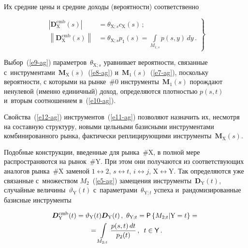 \begin{multicols}{2}
  Их средние цены и средние доходы (ве\-ро\-ят\-ности) соответственно 
  
  \vspace*{2pt}
  
  \noindent
  \begin{equation}
  \left.
  \begin{array}{rl}
  \left\vert \boldsymbol{D}^{\mathrm{cmb}}_{\mathrm{X}}(s)\right\vert &=
\theta_{\mathrm{X};s} c_{\mathrm{X}}(s)\,;\\[6pt]
  \left\| \boldsymbol{D}^{\mathrm{cmb}}_{\mathrm{X}}(s)\right\| 
&=\displaystyle \theta_{\mathrm{X};s} p_1(s)=\int\limits_{M_{1;s}} p(s,y)\,dy\,.
\end{array}
\right\}
  \label{e12-ag}
  \end{equation}
  
  Выбор~(\ref{e9-ag}) параметров~$\theta_{\mathrm{X};s}$ уравнивает 
вероятности, связанные 
с~инструментами~$\boldsymbol{M}_{\mathrm{X}}(s)$~(\ref{e8-ag}) 
и~$\boldsymbol{M}_1(s)$~(\ref{e7-ag}), поскольку вероятности, с которыми на 
рынке~\#0 инструменты~$\boldsymbol{M}_1(s)$ порождают ненулевой (именно 
единичный) доход, определяются плотностью $p(s, t)$ и~вторым соотношением 
в~(\ref{e10-ag}). 
  
  Свойства~(\ref{e12-ag}) инструментов~(\ref{e11-ag}) позволяют назначить 
их, несмотря на составную структуру, новыми цельными базисными 
инструментами комбинированного рынка, фактически реплицирующими 
инструменты~$\boldsymbol{M}_{\mathrm{X}}(s)$. 
  
  Подобные конструкции, введенные для рынка~\#X, в полной мере 
распространяются на рынок~\#Y. При этом они получаются из 
со\-от\-вет\-ст\-ву\-ющих аналогов рынка~\#X заменой $1\leftrightarrow2$, 
$s\leftrightarrow t$, $i\leftrightarrow j$, $\mathrm{X}\leftrightarrow\mathrm{Y}$. 
Так определяются уже связанные с~множеством $M_2$~(\ref{e5-ag}) замещения 
инструменты~$\boldsymbol{D}_{\mathrm{Y}}(t)$, случайные 
величины~$\vartheta_{\mathrm{Y}}(t)$ с~па\-ра\-мет\-ра\-ми~$\theta_{\mathrm{Y};t}$ 
успеха и~рандомизированные базисные инструменты 

\noindent
  \begin{multline}
  \boldsymbol{D}^{\mathrm{cmb}}_{\mathrm{Y}}(t)=\vartheta_{\mathrm{Y}}(t) 
\boldsymbol{D}_{\mathrm{Y}}(t)\,,\
  \theta_{\mathrm{Y};t} ={\sf P}\left\{ M_{2;t}\vert \mathrm{Y}=t\right\} 
={}\\
{}=\int\limits_{M_{2;t}} \displaystyle\frac{\displaystyle p(s,t)\,dt\mathstrut}{\displaystyle p_2(t)\mathstrut}\,,\enskip t\in{\sf Y}\,.
  \label{e13-ag}
  \end{multline}
  

\end{multicols}
